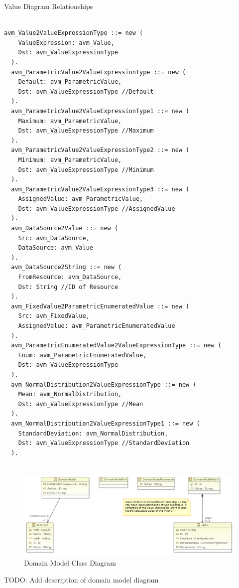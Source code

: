 Value Diagram Relationships
\begin{lstlisting}

avm_Value2ValueExpressionType ::= new (
    ValueExpression: avm_Value,
    Dst: avm_ValueExpressionType
  ).
  avm_ParametricValue2ValueExpressionType ::= new (
    Default: avm_ParametricValue,
    Dst: avm_ValueExpressionType //Default
  ).
  avm_ParametricValue2ValueExpressionType1 ::= new (
    Maximum: avm_ParametricValue,
    Dst: avm_ValueExpressionType //Maximum
  ).
  avm_ParametricValue2ValueExpressionType2 ::= new (
    Minimum: avm_ParametricValue,
    Dst: avm_ValueExpressionType //Minimum
  ).
  avm_ParametricValue2ValueExpressionType3 ::= new (
    AssignedValue: avm_ParametricValue,
    Dst: avm_ValueExpressionType //AssignedValue
  ).
  avm_DataSource2Value ::= new (
    Src: avm_DataSource,
    DataSource: avm_Value
  ).
  avm_DataSource2String ::= new (
    FromResource: avm_DataSource,
    Dst: String //ID of Resource
  ).
  avm_FixedValue2ParametricEnumeratedValue ::= new (
    Src: avm_FixedValue,
    AssignedValue: avm_ParametricEnumeratedValue
  ).
  avm_ParametricEnumeratedValue2ValueExpressionType ::= new (
    Enum: avm_ParametricEnumeratedValue,
    Dst: avm_ValueExpressionType
  ).
  avm_NormalDistribution2ValueExpressionType ::= new (
    Mean: avm_NormalDistribution,
    Dst: avm_ValueExpressionType //Mean
  ).
  avm_NormalDistribution2ValueExpressionType1 ::= new (
    StandardDeviation: avm_NormalDistribution,
    Dst: avm_ValueExpressionType //StandardDeviation
  ).


\end{lstlisting}


\begin{figure}[H]
\centering
\includegraphics[width=\textwidth]{./AVM_Formal_Semantics/4}
\caption{Domain Model Class Diagram}
\end{figure}

TODO: Add description of domain model diagram

